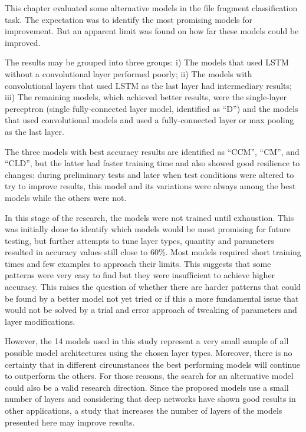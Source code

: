 This chapter evaluated some alternative models in the file fragment classification task. The expectation was to identify the most promising models for improvement. But an apparent limit was found on how far these models could be improved.

The results may be grouped into three groups: i) The models that used LSTM without a convolutional layer performed poorly; ii) The models with convolutional layers that used LSTM as the last layer had intermediary results; iii) The remaining models, which achieved better results, were the single-layer perceptron (single fully-connected layer model, identified as ``D'') and the models that used convolutional models and used a fully-connected layer or max pooling as the last layer.

The three models with best accuracy results are identified as ``CCM'', ``CM'', and ``CLD'', but the latter had faster training time and also showed good resilience to changes: during preliminary tests and later when test conditions were altered to try to improve results, this model and its variations were always among the best models while the others were not.

In this stage of the research, the models were not trained until exhaustion.
This was initially done to identify which models would be most promising for future testing, but further attempts to tune layer types, quantity and parameters resulted in accuracy values still close to 60\%.
Most models required short training times and few examples to approach their limits.
This suggests that some patterns were very easy to find but they were insufficient to achieve higher accuracy.
This raises the question of whether there are harder patterns that could be found by a better model not yet tried or if this a more fundamental issue that would not be solved by a trial and error approach of tweaking of parameters and layer modifications.


However, the 14 models used in this study represent a very small sample of all possible model architectures using the chosen layer types. Moreover, there is no certainty that in different circumstances the best performing models will continue to outperform the others. For those reasons, the search for an alternative model could also be a valid research direction. Since the proposed models use a small number of layers and considering that deep networks have shown good results in other applications, a study that increases the number of layers of the models presented here may improve results.

